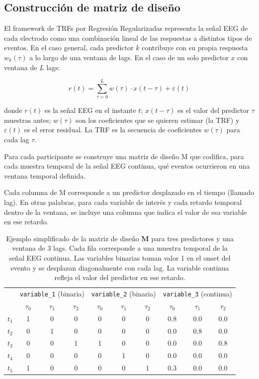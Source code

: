 \subsection{Construcción de matriz de diseño}

El framework de TRFs por Regresión Regularizadas representa la señal EEG de cada electrodo como una combinación lineal de las respuestas a distintos tipos de eventos. En el caso general, cada predictor $k$ contribuye con su propia respuesta $w_k(\tau)$ a lo largo de una ventana de lags. En el caso de un solo predictor $x$ con ventana de $L$ lags:

\begin{equation}
r(t) = \sum_{\tau=0}^{L} w(\tau) \cdot x(t - \tau) + \varepsilon(t)
\end{equation}

\noindent donde $r(t)$ es la señal EEG en el instante $t$; $x(t-\tau)$ es el valor del predictor $\tau$ muestras antes; $w(\tau)$ son los coeficientes que se quieren estimar (la TRF) y $\varepsilon(t)$ es el error residual. La TRF es la secuencia de coeficientes $w(\tau)$ para cada lag $\tau$.

Para cada participante se construye una matriz de diseño M que codifica, para cada muestra temporal de la señal EEG continua, qué eventos ocurrieron en una ventana temporal definida. 

Cada columna de M corresponde a un predictor desplazado en el tiempo (llamado lag). En otras palabras, para cada variable de interés y cada retardo temporal dentro de la ventana, se incluye una columna que indica el valor de esa variable en ese retardo.

\begin{table}[h]
\centering
\small
\begin{tabular}{c|ccc|ccc|ccc}
\toprule
 & \multicolumn{3}{c|}{\texttt{variable\_1} (binaria)} & \multicolumn{3}{c|}{\texttt{variable\_2} (binaria)} & \multicolumn{3}{c}{\texttt{variable\_3} (continua)} \\
 & $\tau_0$ & $\tau_1$ & $\tau_2$ & $\tau_0$ & $\tau_1$ & $\tau_2$ & $\tau_0$ & $\tau_1$ & $\tau_2$ \\
\midrule
$t_1$ & 1 & 0 & 0 & 0 & 0 & 0 & 0.8 & 0.0 & 0.0 \\
$t_2$ & 0 & 1 & 0 & 0 & 0 & 0 & 0.0 & 0.8 & 0.0 \\
$t_3$ & 0 & 0 & 1 & 1 & 0 & 0 & 0.0 & 0.0 & 0.8 \\
$t_4$ & 0 & 0 & 0 & 0 & 1 & 0 & 0.0 & 0.0 & 0.0 \\
$t_5$ & 1 & 0 & 0 & 0 & 0 & 1 & 0.3 & 0.0 & 0.0 \\
\bottomrule
\end{tabular}
\caption{Ejemplo simplificado de la matriz de diseño $\mathbf{M}$ para tres predictores y una ventana de 3 lags. Cada fila corresponde a una muestra temporal de la señal EEG continua. Las variables binarias toman valor 1 en el onset del evento y se desplazan diagonalmente con cada lag. La variable continua refleja el valor del predictor en ese retardo.}
\label{tab:matriz_disenio}
\end{table}

